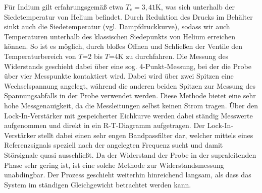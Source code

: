 Für Indium gilt erfahrungsgemäß etwa $T_c=3,41$K, was sich unterhalb der Siedetemperatur von Helium befindet. Durch Reduktion des Drucks im Behälter sinkt auch die Siedetemperatur (vgl. Dampfdruckkurve), sodass wir auch Temperaturen unterhalb des klassischen Siedepunkts von Helium erreichen können. So ist es möglich, durch bloßes Öffnen und Schließen der Ventile den Temperaturbereich von $T$=2 bis $T$=4K zu durchfahren. Die Messung des Widerstands geschieht dabei über eine sog. 4-Punkt-Messung, bei der die Probe über vier Messpunkte kontaktiert wird. Dabei wird über zwei Spitzen eine Wechselspannung angelegt, während die anderen beiden Spitzen zur Messung des Spannungsabfalls in der Probe verwendet werden. Diese Methode bietet eine sehr hohe Messgenauigkeit, da die Messleitungen selbst keinen Strom tragen. Über den Lock-In-Verstärker mit gespeicherter Eichkurve werden dabei ständig Messwerte aufgenommen und direkt in ein R-T-Diagramm aufgetragen. Der Lock-In-Verstärker stellt dabei einen sehr engen Bandpassfilter dar, welcher mittels eines Referenzsignals speziell nach der angelegten Frequenz sucht und damit Störsignale quasi ausschließt. Da der Widerstand der Probe in der supraleitenden Phase sehr gering ist, ist eine solche Methode zur Widerstandsmessung unabdingbar. Der Prozess geschieht weiterhin hinreichend langsam, als dass das System im ständigen Gleichgewicht betrachtet werden kann.
